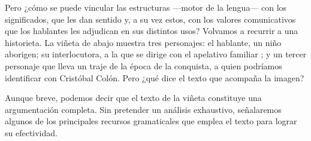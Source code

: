 Pero ¿cómo se puede vincular las estructuras ---motor de la lengua--- con los
significados, que les dan sentido y, a su vez estos, con los valores
comunicativos que los hablantes les adjudican en sus distintos usos? Volvamos a
recurrir a una historieta. La viñeta de abajo muestra tres personajes: el
hablante, un niño aborigen; su interlocutora, a la que se dirige con el
apelativo familiar ; y un tercer personaje que lleva un traje de la
época de la conquista, a quien podríamos identificar con Cristóbal Colón. Pero
¿qué dice el texto que acompaña la imagen?


Aunque breve, podemos decir que el texto de la viñeta constituye una
argumentación completa. Sin pretender un análisis exhaustivo, señalaremos
algunos de los principales recursos gramaticales que emplea el texto para
lograr su efectividad.

